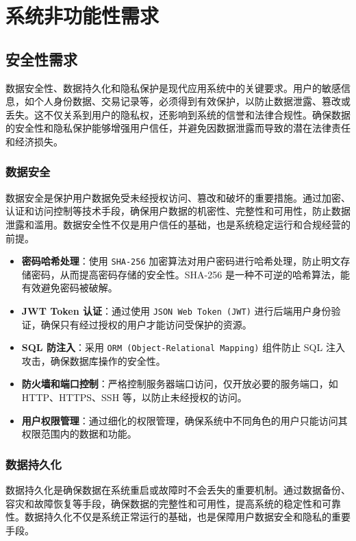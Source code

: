 \section{系统非功能性需求}\label{sec:System_Non_Functional_Requirements}

\subsection{安全性需求}

数据安全性、数据持久化和隐私保护是现代应用系统中的关键要求。用户的敏感信息，如个人身份数据、交易记录等，必须得到有效保护，以防止数据泄露、篡改或丢失。这不仅关系到用户的隐私权，还影响到系统的信誉和法律合规性。确保数据的安全性和隐私保护能够增强用户信任，并避免因数据泄露而导致的潜在法律责任和经济损失。

\subsubsection{数据安全}

数据安全是保护用户数据免受未经授权访问、篡改和破坏的重要措施。通过加密、认证和访问控制等技术手段，确保用户数据的机密性、完整性和可用性，防止数据泄露和滥用。数据安全性不仅是用户信任的基础，也是系统稳定运行和合规经营的前提。

\begin{itemize}
	\item \textbf{密码哈希处理}：使用 \texttt{SHA-256} 加密算法对用户密码进行哈希处理，防止明文存储密码，从而提高密码存储的安全性。SHA-256 是一种不可逆的哈希算法，能有效避免密码被破解。
	\item \textbf{JWT Token 认证}：通过使用 \texttt{JSON Web Token (JWT)} 进行后端用户身份验证，确保只有经过授权的用户才能访问受保护的资源。
	\item \textbf{SQL 防注入}：采用 \texttt{ORM (Object-Relational Mapping)} 组件防止 SQL 注入攻击，确保数据库操作的安全性。
	\item \textbf{防火墙和端口控制}：严格控制服务器端口访问，仅开放必要的服务端口，如 HTTP、HTTPS、SSH 等，以防止未经授权的访问。
	\item \textbf{用户权限管理}：通过细化的权限管理，确保系统中不同角色的用户只能访问其权限范围内的数据和功能。
\end{itemize}

\subsubsection{数据持久化}

数据持久化是确保数据在系统重启或故障时不会丢失的重要机制。通过数据备份、容灾和故障恢复等手段，确保数据的完整性和可用性，提高系统的稳定性和可靠性。数据持久化不仅是系统正常运行的基础，也是保障用户数据安全和隐私的重要手段。

